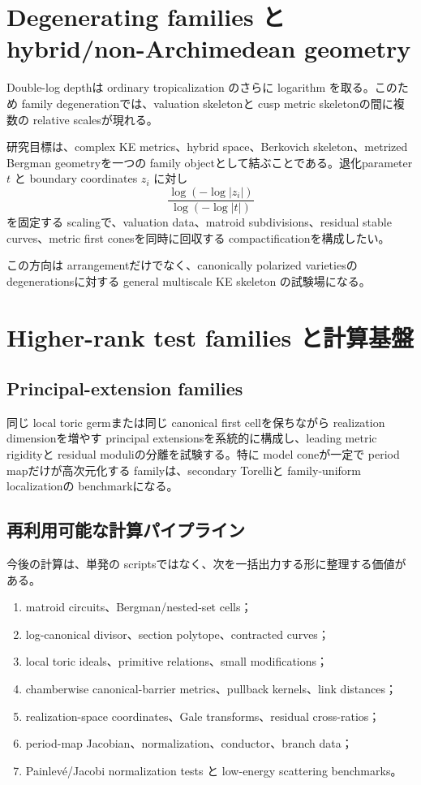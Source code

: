 \documentclass[11pt,a4paper]{ltjsarticle}
\theoremstyle{plain}
\theoremstyle{definition}
\theoremstyle{remark}
\begin{document}
\section{Degenerating families と hybrid/non-Archimedean geometry}

Double-log depthは ordinary tropicalization のさらに logarithm を取る。このため family degenerationでは、valuation skeletonと cusp metric skeletonの間に複数の relative scalesが現れる。

研究目標は、complex KE metrics、hybrid space、Berkovich skeleton、metrized Bergman geometryを一つの family objectとして結ぶことである。退化parameter $t$ と boundary coordinates $z_i$ に対し
\[
 \frac{\log(-\log|z_i|)}{\log(-\log|t|)}
\]
を固定する scalingで、valuation data、matroid subdivisions、residual stable curves、metric first conesを同時に回収する compactificationを構成したい。

この方向は arrangementだけでなく、canonically polarized varietiesの degenerationsに対する general multiscale KE skeleton の試験場になる。

\section{Higher-rank test families と計算基盤}

\subsection{Principal-extension families}

同じ local toric germまたは同じ canonical first cellを保ちながら realization dimensionを増やす principal extensionsを系統的に構成し、leading metric rigidityと residual moduliの分離を試験する。特に model coneが一定で period mapだけが高次元化する familyは、secondary Torelliと family-uniform localizationの benchmarkになる。

\subsection{再利用可能な計算パイプライン}

今後の計算は、単発の scriptsではなく、次を一括出力する形に整理する価値がある。
\begin{enumerate}
 \item matroid circuits、Bergman/nested-set cells；
 \item log-canonical divisor、section polytope、contracted curves；
 \item local toric ideals、primitive relations、small modifications；
 \item chamberwise canonical-barrier metrics、pullback kernels、link distances；
 \item realization-space coordinates、Gale transforms、residual cross-ratios；
 \item period-map Jacobian、normalization、conductor、branch data；
 \item Painlev\'e/Jacobi normalization tests と low-energy scattering benchmarks。
\end{enumerate}
\end{document}
